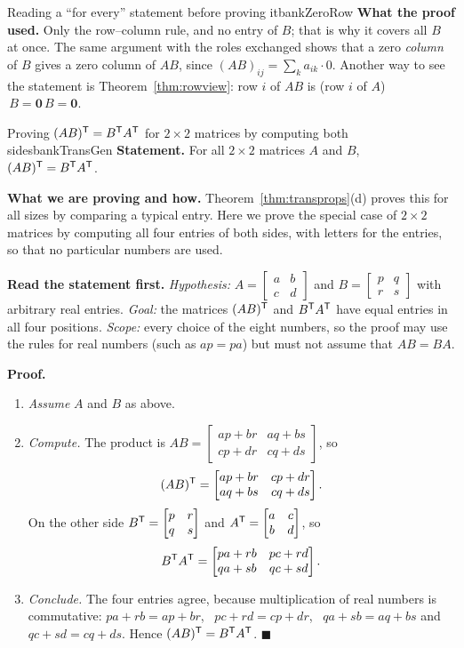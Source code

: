 \documentclass[11pt]{article}
\begin{document}
\begin{exmp}{Reading a ``for every'' statement before proving it}{bankZeroRow}
\textbf{What the proof used.} Only the row--column rule, and no entry of $B$; that is why it covers all $B$ at once. The same argument with the roles exchanged shows that a zero \emph{column} of $B$ gives a zero column of $AB$, since $(AB)_{ij}=\sum_ka_{ik}\cdot0$. Another way to see the statement is Theorem~\ref{thm:rowview}: row $i$ of $AB$ is (row $i$ of $A$)$\,B=\mathbf{0}\,B=\mathbf{0}$.
\end{exmp}

\begin{exmp}{Proving $(AB)^{\mathsf T}=B^{\mathsf T} A^{\mathsf T}$ for $2\times2$ matrices by computing both sides}{bankTransGen}
\textbf{Statement.} For all $2\times2$ matrices $A$ and $B$, \ $(AB)^{\mathsf T}=B^{\mathsf T} A^{\mathsf T}$.

\textbf{What we are proving and how.} Theorem~\ref{thm:transprops}(d) proves this for all sizes by comparing a typical entry. Here we prove the special case of $2\times2$ matrices by computing all four entries of both sides, with letters for the entries, so that no particular numbers are used.

\textbf{Read the statement first.} \emph{Hypothesis:} $A=\begin{bmatrix}a&b\\c&d\end{bmatrix}$ and $B=\begin{bmatrix}p&q\\r&s\end{bmatrix}$ with arbitrary real entries. \emph{Goal:} the matrices $(AB)^{\mathsf T}$ and $B^{\mathsf T} A^{\mathsf T}$ have equal entries in all four positions. \emph{Scope:} every choice of the eight numbers, so the proof may use the rules for real numbers (such as $ap=pa$) but must not assume that $AB=BA$.

\textbf{Proof.}
\begin{enumerate}[itemsep=2pt]
  \item \emph{Assume} $A$ and $B$ as above.
  \item \emph{Compute.} The product is $AB=\begin{bmatrix}ap+br&aq+bs\\cp+dr&cq+ds\end{bmatrix}$, so
  \[
  (AB)^{\mathsf T}=\begin{bmatrix}ap+br&cp+dr\\aq+bs&cq+ds\end{bmatrix}.
  \]
  On the other side $B^{\mathsf T}=\begin{bmatrix}p&r\\q&s\end{bmatrix}$ and $A^{\mathsf T}=\begin{bmatrix}a&c\\b&d\end{bmatrix}$, so
  \[
  B^{\mathsf T} A^{\mathsf T}=\begin{bmatrix}pa+rb&pc+rd\\qa+sb&qc+sd\end{bmatrix}.
  \]
  \item \emph{Conclude.} The four entries agree, because multiplication of real numbers is commutative: $pa+rb=ap+br$, \ $pc+rd=cp+dr$, \ $qa+sb=aq+bs$ and $qc+sd=cq+ds$. Hence $(AB)^{\mathsf T}=B^{\mathsf T} A^{\mathsf T}$. \qquad$\blacksquare$
\end{enumerate}


\end{exmp}
\end{document}
